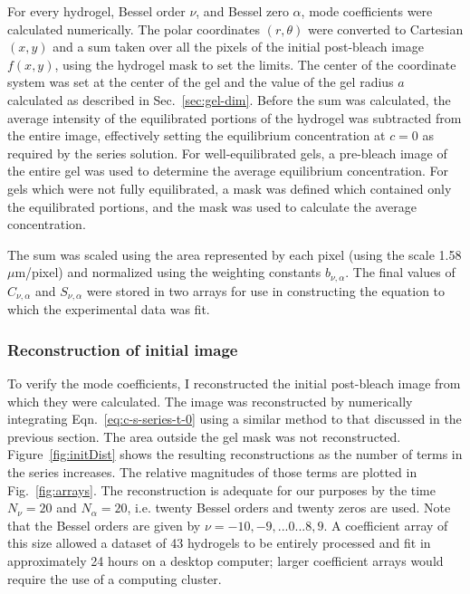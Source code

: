 For every hydrogel, Bessel order $\nu$, and Bessel zero $\alpha$, mode coefficients were calculated numerically.  The polar coordinates $(r,\theta)$ were converted to Cartesian $(x,y)$ and a sum taken over all the pixels of the initial post-bleach image $f(x,y)$, using the hydrogel mask to set the limits.  The center of the coordinate system was set at the center of the gel and the value of the gel radius $a$ calculated as described in Sec.~\ref{sec:gel-dim}. Before the sum was calculated, the average intensity of the equilibrated portions of the hydrogel was subtracted from the entire image, effectively setting the equilibrium concentration at $c=0$ as required by the series solution.  For well-equilibrated gels, a pre-bleach image of the entire gel was used to determine the average equilibrium concentration.  For gels which were not fully equilibrated, a mask was defined which contained only the equilibrated portions, and the mask was used to calculate the average concentration.

The sum was scaled using the area represented by each pixel (using the scale 1.58 $\mu$m/pixel) and normalized using the weighting constants $b_{\nu,\alpha}$.  The final values of $C_{\nu,\alpha}$ and $S_{\nu,\alpha}$ were stored in two arrays for use in constructing the equation to which the experimental data was fit.


\subsubsection{Reconstruction of initial image}

To verify the mode coefficients, I reconstructed the initial post-bleach image from which they were calculated.  The image was reconstructed by numerically integrating Eqn.~\ref{eq:c-s-series-t-0} using a similar method to that discussed in the previous section.  The area outside the gel mask was not reconstructed.  Figure~\ref{fig:initDist} shows the resulting reconstructions as the number of terms in the series increases.  The relative magnitudes of those terms are plotted in Fig.~\ref{fig:arrays}.  The reconstruction is adequate for our purposes by the time $N_\nu = 20$ and $N_\alpha = 20$, i.e. twenty Bessel orders and twenty zeros are used.  Note that the Bessel orders are given by $\nu = -10,-9,...0...8,9$.  A coefficient array of this size allowed a dataset of 43 hydrogels to be entirely processed and fit in approximately 24 hours on a desktop computer; larger coefficient arrays would require the use of a computing cluster.

